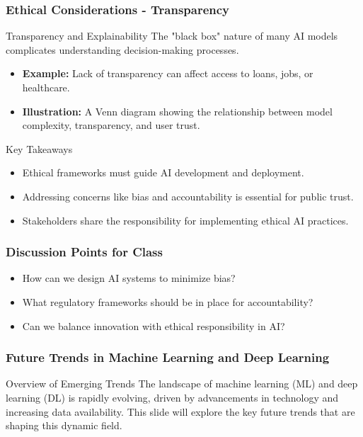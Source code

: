\documentclass[aspectratio=169]{beamer}
\begin{document}
\begin{frame}[fragile]
    \frametitle{Ethical Considerations - Transparency}
    \begin{block}{Transparency and Explainability}
        The "black box" nature of many AI models complicates understanding decision-making processes.
        \begin{itemize}
            \item \textbf{Example:} Lack of transparency can affect access to loans, jobs, or healthcare.
            \item \textbf{Illustration:} A Venn diagram showing the relationship between model complexity, transparency, and user trust.
        \end{itemize}
    \end{block}

    \begin{block}{Key Takeaways}
        \begin{itemize}
            \item Ethical frameworks must guide AI development and deployment.
            \item Addressing concerns like bias and accountability is essential for public trust.
            \item Stakeholders share the responsibility for implementing ethical AI practices.
        \end{itemize}
    \end{block}
\end{frame}

\begin{frame}[fragile]
    \frametitle{Discussion Points for Class}
    \begin{itemize}
        \item How can we design AI systems to minimize bias?
        \item What regulatory frameworks should be in place for accountability?
        \item Can we balance innovation with ethical responsibility in AI?
    \end{itemize}
\end{frame}

\begin{frame}[fragile]
    \frametitle{Future Trends in Machine Learning and Deep Learning}
    
    \begin{block}{Overview of Emerging Trends}
        The landscape of machine learning (ML) and deep learning (DL) is rapidly evolving, driven by advancements in technology and increasing data availability. This slide will explore the key future trends that are shaping this dynamic field.
    \end{block}
\end{frame}
\end{document}
